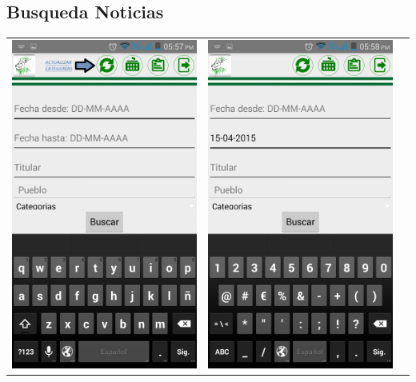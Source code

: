 \subsection{Busqueda Noticias}

\begin{tabular}{p{7cm}p{8mm}p{7cm}}

\includegraphics[width=6.5cm]{./android/imagenes/bus1.png}

&

\includegraphics[width=6.5cm]{./android/imagenes/bus2.png}


\end{tabular}
